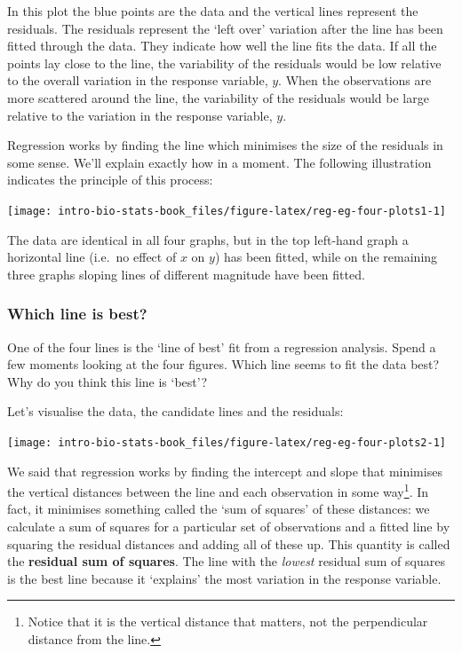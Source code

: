 \documentclass[
]{book}
\newenvironment{greybox}{
  \definecolor{shadecolor}{rgb}{0.95,0.95,0.95}  %
  \color{black}
  \begin{shaded}}
 {\end{shaded}}
\newenvironment{infobox}[1]
  {
  \begin{itemize}
  \renewcommand{\labelitemi}{
    \raisebox{-.7\height}[0pt][0pt]{
      {\setkeys{Gin}{width=3em,keepaspectratio}
        \texttt{[image: images/\#1]}}
    }
  }
  \setlength{\fboxsep}{1em}
  \begin{greybox}
  \item
  }
  {
  \end{greybox}
  \end{itemize}
  }
\begin{document}
In this plot the blue points are the data and the vertical lines represent the residuals. The residuals represent the `left over' variation after the line has been fitted through the data. They indicate how well the line fits the data. If all the points lay close to the line, the variability of the residuals would be low relative to the overall variation in the response variable, \(y\). When the observations are more scattered around the line, the variability of the residuals would be large relative to the variation in the response variable, \(y\).

Regression works by finding the line which minimises the size of the residuals in some sense. We'll explain exactly how in a moment. The following illustration indicates the principle of this process:

\begin{center}\texttt{[image: intro-bio-stats-book\_files/figure-latex/reg-eg-four-plots1-1]} \end{center}

The data are identical in all four graphs, but in the top left-hand graph a horizontal line (i.e.~no effect of \(x\) on \(y\)) has been fitted, while on the remaining three graphs sloping lines of different magnitude have been fitted.

\begin{infobox}{action}

\hypertarget{which-line-is-best}{%
\subsubsection*{Which line is best?}\label{which-line-is-best}}

One of the four lines is the `line of best' fit from a regression analysis. Spend a few moments looking at the four figures. Which line seems to fit the data best? Why do you think this line is `best'?

\end{infobox}

Let's visualise the data, the candidate lines and the residuals:

\begin{center}\texttt{[image: intro-bio-stats-book\_files/figure-latex/reg-eg-four-plots2-1]} \end{center}

We said that regression works by finding the intercept and slope that minimises the vertical distances between the line and each observation in some way\footnote{Notice that it is the vertical distance that matters, not the perpendicular distance from the line.}. In fact, it minimises something called the `sum of squares' of these distances: we calculate a sum of squares for a particular set of observations and a fitted line by squaring the residual distances and adding all of these up. This quantity is called the \textbf{residual sum of squares}. The line with the \emph{lowest} residual sum of squares is the best line because it `explains' the most variation in the response variable.
\end{document}
